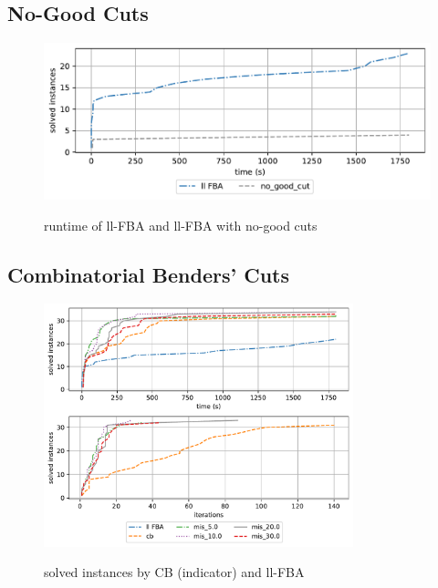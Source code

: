 \subsection{No-Good Cuts}
\begin{figure}[h!]
    \caption{runtime of ll-FBA and ll-FBA with no-good cuts}
    \centering
    \includegraphics[width=1.0\textwidth]{Images/no_good_cuts_comparison_plot.pdf}
    \label{fig:cff_comparison}
\end{figure}

\subsection{Combinatorial Benders' Cuts}

\begin{figure}[h!]
    \caption{solved instances by CB (indicator) and ll-FBA}
    \centering
    \includegraphics[width=0.8\textwidth]{Images/mis_comparison_solved_instances.pdf}
    \label{fig:mis_comparison_solved_instances}
\end{figure}

